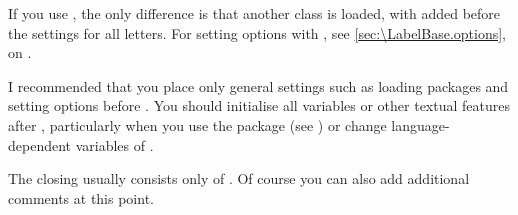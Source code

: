 If you use , the only difference is
that another class is loaded, with
 added before the
settings for all letters. For setting options with , see
\autoref{sec:\LabelBase.options}, on .

I recommended that you place only general settings such as loading packages
and setting options before . You should
initialise all variables or other textual features after
, particularly when you use the
 package (see \cite{package:babel}) or
change language-dependent variables of .

The closing usually consists only of . Of
course you can also add additional comments at this point.

